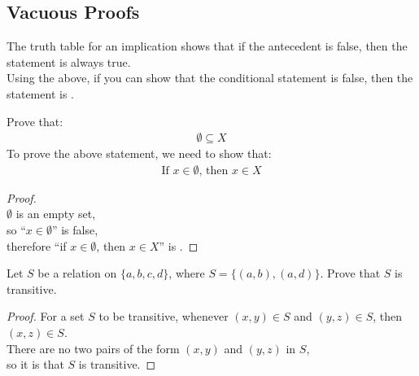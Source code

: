 \documentclass[\main/notes.tex]{subfiles}
\begin{document}
			\subsection{Vacuous Proofs}
				The truth table for an implication shows that if the antecedent is false, then the statement is always true.\\
				Using the above, if you can show that the conditional statement is false, then the statement is .
				\begin{example}[width=0.7\textwidth]
					Prove that:
					\begin{align*}
						\emptyset \subseteq X
					\end{align*}
					To prove the above statement, we need to show that:
						\begin{align*}
							\text{If } x \in \emptyset \text{, then } x \in X
						\end{align*}
					\begin{proof}
						$ $\\
						$\emptyset$ is an empty set,\\
						so ``$x \in \emptyset$'' is false,\\
						therefore ``if $x \in \emptyset$, then $x \in X$'' is .
					\end{proof}
				\end{example}
				\begin{example}
					Let $S$ be a relation on $\{a, b, c, d\}$, where $S = \bigl\{(a, b), (a, d)\bigr\}$. Prove that $S$ is transitive.
					\begin{proof} For a set $S$ to be transitive, whenever $(x, y) \in S$ and $(y, z) \in S$, then $(x, z) \in S$.\\
						There are no two pairs of the form $(x, y)$ and $(y, z)$ in $S$,\\
						so it is  that $S$ is transitive.
					\end{proof}
				\end{example}
\end{document}
